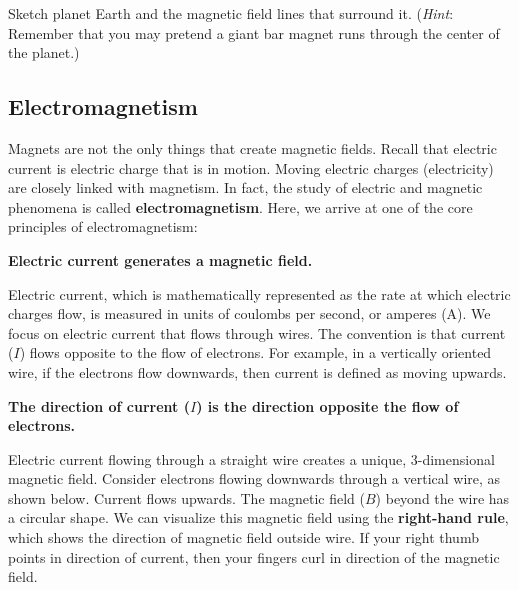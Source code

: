 \documentclass{article}
\begin{document}
\begin{exercise}
    Sketch planet Earth and the magnetic field lines that surround it. (\textit{Hint}: Remember that you may pretend a giant bar magnet runs through the center of the planet.) 
\end{exercise}



\clearpage
\subsection*{Electromagnetism} \label{okuZoJ}


Magnets are not the only things that create magnetic fields. Recall that electric current is electric charge that is in motion. Moving electric charges (electricity) are closely linked with magnetism. In fact, the study of electric and magnetic phenomena is called \textbf{electromagnetism}. Here, we arrive at one of the core principles of electromagnetism:

\begin{center}
    \centering
    \textbf{Electric current generates a magnetic field.}
\end{center}



Electric current, which is mathematically represented as the rate at which electric charges flow, is measured in units of coulombs per second, or amperes (A). We focus on electric current that flows through wires. The convention is that current ($I$) flows opposite to the flow of electrons. For example, in a vertically oriented wire, if the electrons flow downwards, then current is defined as moving upwards.

\begin{center}
    \centering
    \textbf{The direction of current ($I$) is the direction opposite the flow of electrons.}
\end{center}

Electric current flowing through a straight wire creates a unique, 3-dimensional magnetic field. Consider electrons flowing downwards through a vertical wire, as shown below. Current flows upwards. The magnetic field ($B$) beyond the wire has a circular shape. We can visualize this magnetic field using the \textbf{right-hand rule}, which shows the direction of magnetic field outside wire. If your right thumb points in direction of current, then your fingers curl in direction of the magnetic field. 
\end{document}
